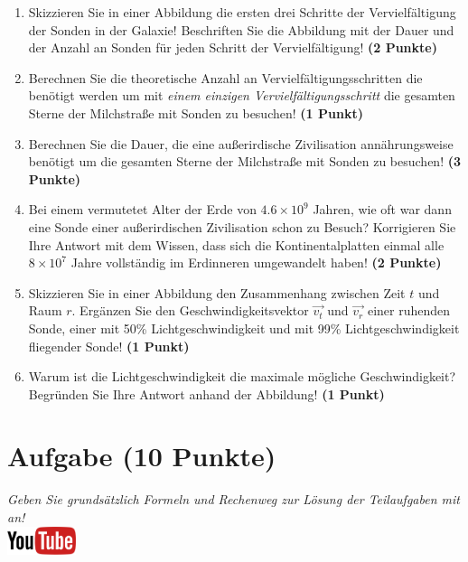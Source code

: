 \documentclass[a4paper, 10pt]{scrartcl}\usepackage[]{graphicx}\usepackage[]{xcolor}
\begin{document}
\begin{enumerate}
\item Skizzieren Sie in einer Abbildung die ersten drei Schritte der
  Vervielf{\"a}ltigung der Sonden in der Galaxie! Beschriften Sie die Abbildung
  mit der Dauer und der Anzahl an Sonden f{\"u}r jeden Schritt der Vervielf{\"a}ltigung! \textbf{(2 Punkte)}
\item Berechnen Sie die theoretische Anzahl an Vervielf{\"a}ltigungsschritten die
  ben{\"o}tigt werden um mit \textit{einem einzigen Vervielf{\"a}ltigungsschritt} die
  gesamten Sterne der Milchstra{\ss}e mit Sonden zu besuchen! \textbf{(1 Punkt)}
\item Berechnen Sie die Dauer, die eine au{\ss}erirdische Zivilisation
  ann{\"a}hrungsweise ben{\"o}tigt um die gesamten Sterne der Milchstra{\ss}e mit
  Sonden zu besuchen! \textbf{(3 Punkte)}
\item Bei einem vermutetet Alter der Erde von $\ensuremath{4.6\times 10^{9}}$ Jahren,
  wie oft war dann eine Sonde einer au{\ss}erirdischen Zivilisation schon zu
  Besuch? Korrigieren Sie Ihre Antwort mit dem Wissen, dass sich die
  Kontinentalplatten einmal alle $\ensuremath{8\times 10^{7}}$ Jahre vollst{\"a}ndig im
  Erdinneren umgewandelt haben! \textbf{(2 Punkte)}
\item Skizzieren Sie in einer Abbildung den Zusammenhang zwischen Zeit $t$
  und Raum $r$. Erg{\"a}nzen Sie den Geschwindigkeitsvektor $\vec{v_t}$ und
  $\vec{v_r}$ einer ruhenden Sonde, einer mit 50\% Lichtgeschwindigkeit und
  mit 99\% Lichtgeschwindigkeit fliegender Sonde! \textbf{(1 Punkt)}
\item Warum ist die Lichtgeschwindigkeit die maximale m{\"o}gliche Geschwindigkeit?
Begr{\"u}nden Sie Ihre Antwort anhand der Abbildung!  \textbf{(1 Punkt)}
\end{enumerate}


 
\clearpage

\section{Aufgabe \hfill (10 Punkte)}

\textit{Geben Sie grunds{\"a}tzlich Formeln und Rechenweg zur L{\"o}sung der
  Teilaufgaben mit an!} \\[1Ex]

\hfill\href{https://youtu.be/aBxLkdF-c4M}{\includegraphics[width =
  2cm]{img/youtube}} %
\hspace{2Ex}
\end{document}
